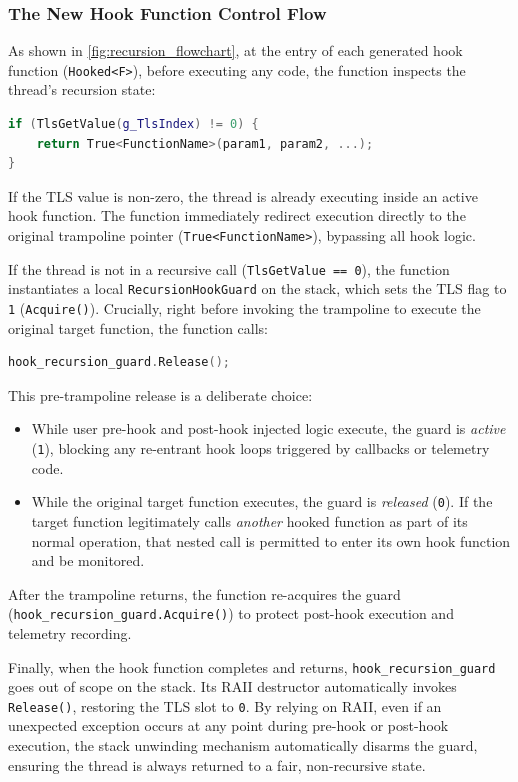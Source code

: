 \subsubsection{The New Hook Function Control Flow}

As shown in \cref{fig:recursion_flowchart}, at the entry of each generated hook function (\texttt{Hooked<F>}), before executing any code, the function inspects the thread's recursion state:
\begin{lstlisting}[language=C++, basicstyle=\ttfamily\footnotesize]
if (TlsGetValue(g_TlsIndex) != 0) {
    return True<FunctionName>(param1, param2, ...);
}
\end{lstlisting}

If the \ac{TLS} value is non-zero, the thread is already executing inside an active hook function.
The function immediately redirect execution directly to the original trampoline pointer (\texttt{True<FunctionName>}), bypassing all hook logic.

If the thread is not in a recursive call (\texttt{TlsGetValue == 0}), the function instantiates a local \texttt{RecursionHookGuard} on the stack, which sets the \ac{TLS} flag to \texttt{1} (\texttt{Acquire()}).
Crucially, right before invoking the trampoline to execute the original target function, the function calls:
\begin{lstlisting}[language=C++, basicstyle=\ttfamily\footnotesize]
hook_recursion_guard.Release();
\end{lstlisting}

This pre-trampoline release is a deliberate choice:
\begin{itemize}
	\item While user pre-hook and post-hook injected logic execute, the guard is \emph{active} (\texttt{1}), blocking any re-entrant hook loops triggered by callbacks or telemetry code.
	\item While the original target function executes, the guard is \emph{released} (\texttt{0}).
	If the target function legitimately calls \emph{another} hooked function as part of its normal operation, that nested call is permitted to enter its own hook function and be monitored.
\end{itemize}
After the trampoline returns, the function re-acquires the guard (\texttt{hook\_recursion\_guard.}\allowbreak\texttt{Acquire()}) to protect post-hook execution and telemetry recording.

Finally, when the hook function completes and returns, \texttt{hook\_recursion\_guard} goes out of scope on the stack.
Its RAII destructor automatically invokes \texttt{Release()}, restoring the \ac{TLS} slot to \texttt{0}.
By relying on RAII, even if an unexpected exception occurs at any point during pre-hook or post-hook execution, the stack unwinding mechanism automatically disarms the guard, ensuring the thread is always returned to a fair, non-recursive state.

